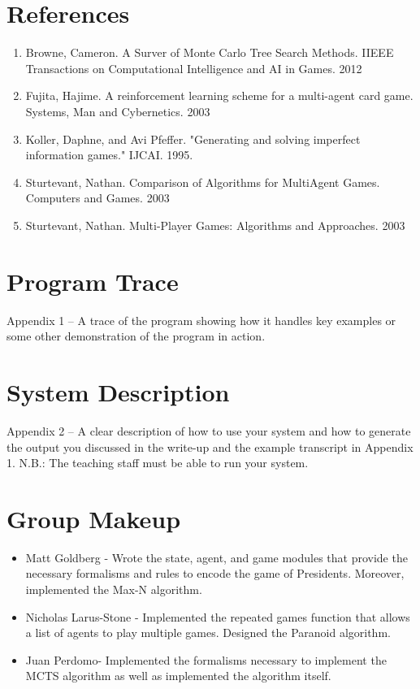 \documentclass[11pt]{article}
\begin{document}
\section{References}

\begin{enumerate}
\item Browne, Cameron. A Surver of Monte Carlo Tree Search Methods. IIEEE Transactions on Computational Intelligence and AI in Games. 2012

\item Fujita, Hajime. A reinforcement learning scheme for a multi-agent card game. Systems, Man and Cybernetics. 2003

\item Koller, Daphne, and Avi Pfeffer. "Generating and solving imperfect information games." IJCAI. 1995.

\item Sturtevant, Nathan. Comparison of Algorithms for MultiAgent Games. Computers and Games. 2003

\item Sturtevant, Nathan. Multi-Player Games: Algorithms and Approaches. 2003

\end{enumerate}


\appendix

\section{Program Trace}

Appendix 1 – A trace of the program showing how it handles key examples or some other demonstration of the program in action.

\section{System Description}

 Appendix 2 – A clear description of how to use your system and how to generate the output you discussed in the write-up and the example transcript in Appendix 1. N.B.: The teaching staff must be able to run your system.

\section{Group Makeup}

\begin{itemize}
\item Matt Goldberg - Wrote the state, agent, and game modules that provide the necessary formalisms and rules to encode the game of Presidents. Moreover, implemented the Max-N algorithm.
\item Nicholas Larus-Stone - Implemented the repeated games function that allows a list of agents to play multiple games. Designed the Paranoid algorithm.
\item Juan Perdomo-  Implemented the formalisms necessary to implement the MCTS algorithm as well as implemented the algorithm itself.
\end{itemize}
\end{document}
